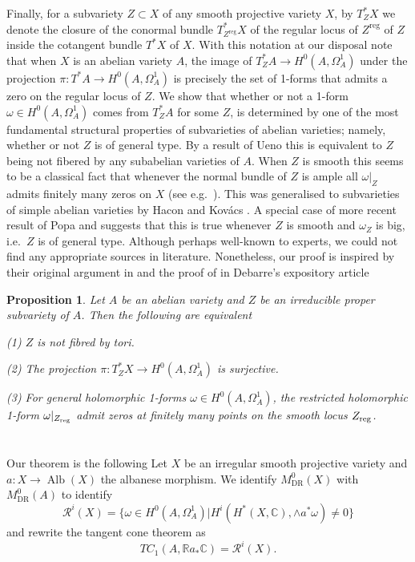 \documentclass[11pt,reqno]{amsart}
\newtheorem{proposition}[theorem]{Proposition}
\theoremstyle{definition}
\theoremstyle{remark}
\theoremstyle{cited}
\theoremstyle{citeddef}
\DeclareMathOperator{\reg}{reg}                  %
\DeclareMathOperator{\Alb}{Alb}
\newcommand{\sR}{\mathcal{R}}
\newcommand{\bbC}{\mathbb{C}}
\newcommand{\bbR}{\mathbb{R}}
\DeclareMathOperator{\DR}{DR}
\begin{document}
Finally, for a subvariety $Z\subset X$ of any smooth projective variety $X$, by 
$T^*_ZX$ we denote the closure of the conormal bundle $T^*_{Z^{\reg}}X$ of the regular locus of $Z^{\reg}$ of $Z$
inside the cotangent bundle $T^*X$ of $X$. With this notation at our disposal note that when $X$ is an abelian variety
$A$, the image of $T^*_ZA\to H^0(A,\Omega_A^1)$ under the projection $\pi\colon T^*A \to H^0(A,\Omega_A^1)$ is precisely the set of 1-forms that admits a zero on the regular locus of $Z$.
We show that whether or not a 1-form $\omega\in H^0(A,\Omega_A^1)$
comes from $T^*_ZA$ for some $Z$, is determined by one of the most fundamental
 structural properties of subvarieties of abelian varieties;
 namely, whether or not
$Z$ is of general type. By a result of Ueno \cite[Theorem 10.9]{Uen75} this is equivalent to $Z$ being not fibered by any subabelian varieties of $A$. 
When $Z$ is smooth 
this seems to be a classical fact that whenever the normal bundle of $Z$ is ample all $\omega|_Z$ admits finitely many zeros on $X$
(see e.g.\ \cite[Lemma 3.1]{Deb}). This was generalised to subvarieties of simple abelian varieties by 
Hacon and Kov\'acs \cite[Proposition 3.1]{HK05}. A special case of more recent result of Popa and \cite{PS14} suggests that this is true whenever $Z$ is smooth and
$\omega_Z$ is big,
i.e.\ $Z$ is of general type. Although perhaps well-known to experts, we could not find any appropriate sources in literature. Nonetheless, our proof is inspired
by their original argument in\cite[Proposition 3.1]{HK05} and the proof of \cite[Lemma 3.1]{Deb} in Debarre's expository article

\begin{proposition}
\label{van-nonsimple}
Let $A$ be an abelian variety and $Z$ be an irreducible proper subvariety of $A$. Then the following are equivalent

(1) $Z$ is not fibred by tori. 

(2) The projection $\pi\colon T^*_ZX\to H^0(A, \Omega_A^1)$ is surjective.

(3) For general holomorphic 1-forms $\omega\in H^0(A, \Omega_A^1)$, the restricted holomorphic 1-form $\omega|_{Z_{\textnormal{reg}}}$ admit zeros at finitely many points on the smooth locus $Z_{\textnormal{reg}}$.
\end{proposition}



\section{}
Our theorem is the following
Let $X$ be an irregular smooth projective variety and $a\colon X\to \Alb(X)$ the albanese morphism. We identify $M_{\DR}^0(X)$ with $M_{\DR}^0(A)$ 
to identify
\[\sR^i(X) = \{\omega\in H^0(A, \Omega_A^1)| H^i(H^*(X, \bbC), \wedge a^*\omega)\neq 0\}\]
and rewrite the tangent cone theorem as 
\[TC_1(A, \bbR a_*\bbC) = \sR^i(X).\]
\end{document}
